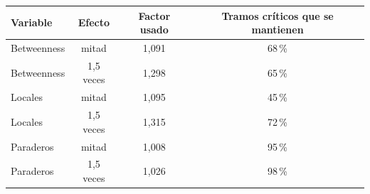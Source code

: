 \begin{tabular}{lccc}
\toprule
Variable & Efecto & Factor usado & Tramos críticos que se mantienen \\
\midrule
Betweenness & mitad & 1,091 & 68\,\% \\
Betweenness & 1,5 veces & 1,298 & 65\,\% \\
Locales & mitad & 1,095 & 45\,\% \\
Locales & 1,5 veces & 1,315 & 72\,\% \\
Paraderos & mitad & 1,008 & 95\,\% \\
Paraderos & 1,5 veces & 1,026 & 98\,\% \\
\bottomrule
\end{tabular}
